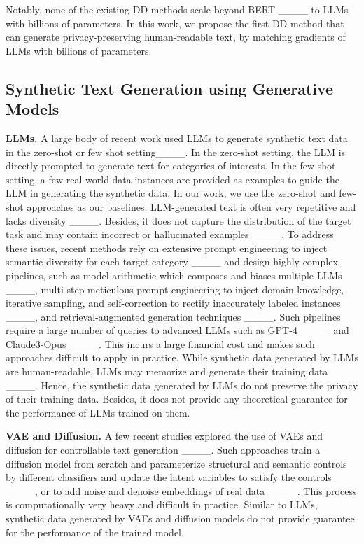 Notably, none of the existing DD methods scale beyond BERT ____ to LLMs with billions of parameters.
In this work, we propose the first DD method that can generate privacy-preserving human-readable text, by matching gradients of LLMs with billions of parameters. 



\subsection{Synthetic Text Generation using Generative Models}

\textbf{LLMs.} A large body of recent work used LLMs to generate synthetic text data in the
zero-shot or few shot setting____. In the zero-shot setting, the LLM is directly prompted to generate text for categories of interests. In the few-shot setting, a few real-world data instances are provided as examples to guide the LLM in generating the synthetic data. 
In our work, we use the zero-shot and few-shot approaches as our baselines.
%
LLM-generated text is often very repetitive and lacks diversity ____. Besides, it does not capture the distribution of the target task and may contain incorrect or hallucinated examples  ____. 
To address these issues, recent methods rely on extensive prompt engineering to inject semantic diversity for each target category ____ and design highly complex pipelines, such as model arithmetic which composes and biases multiple LLMs ____, multi-step meticulous prompt engineering to inject domain knowledge, iterative sampling, and self-correction to rectify inaccurately labeled instances ____, and retrieval-augmented generation techniques ____. 
Such pipelines require a large number of queries to advanced LLMs such as GPT-4 ____ and Claude3-Opus ____. %
This incurs a large financial cost and makes such approaches difficult %
to apply in practice.
%
While synthetic data generated by LLMs are human-readable, LLMs may memorize and generate their training data ____. Hence, the synthetic data generated by LLMs do not preserve the privacy of their training data. Besides, it does not provide any theoretical guarantee for the performance of LLMs trained on them. 


\textbf{VAE and Diffusion.} A few recent studies explored the use of VAEs and diffusion for %
controllable text generation ____. Such approaches train a diffusion model from scratch and parameterize structural and semantic controls by different classifiers and update the latent variables to satisfy the controls ____, or to add noise and denoise embeddings of real data ____. This process is computationally very heavy and difficult in practice.
%
Similar to LLMs, synthetic data generated by VAEs and diffusion models do not provide guarantee for the performance of the trained model. %


%
%

%
%
%
%
%

%

%